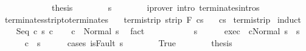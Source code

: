 \begin{isabellebody}
\ \ \ \ \isacommand{{\isacharbraceright}}\isamarkupfalse%
\isanewline
\ \ \ \ \isamarkupfalse%
\ \isamarkupfalse%
\ {\isacharquery}thesis\isanewline
\ \ \ \ \ \ \isamarkupfalse%
\ s\isanewline
\ \ \ \ \ \ \isamarkupfalse%
\ {\isacharparenleft}iprover\ intro{\isacharcolon}\ terminates{\isachardot}intros{\isacharparenright}\isanewline
\ \ \isamarkupfalse%
\isanewline
{}\isamarkupfalse%
%
\endisatagproof
{\isafoldproof}%
%
\isadelimproof
\isanewline
%
\endisadelimproof
\isanewline
{}\isamarkupfalse%
\ terminates{\isacharunderscore}strip{\isacharunderscore}to{\isacharunderscore}terminates{\isacharcolon}\isanewline
\ \ \ termi{\isacharunderscore}strip{\isacharcolon}\ {\isachardoublequoteopen}strip\ F\ {\isasymGamma}{\isasymturnstile}c{\isasymdown}s{\isachardoublequoteclose}\isanewline
\ \ \ {\isachardoublequoteopen}{\isasymGamma}{\isasymturnstile}c{\isasymdown}s{\isachardoublequoteclose}\isanewline
%
\isadelimproof
%
\endisadelimproof
%
\isatagproof
{}\isamarkupfalse%
\ termi{\isacharunderscore}strip\isanewline
{}\isamarkupfalse%
\ induct\isanewline
\ \ \isamarkupfalse%
\ {\isacharparenleft}Seq\ c{}\ s\ c{}{\isacharparenright}\isanewline
\ \ \isamarkupfalse%
\ {\isachardoublequoteopen}{\isasymGamma}{\isasymturnstile}c{}\ {\isasymdown}\ Normal\ s{\isachardoublequoteclose}\ \isamarkupfalse%
\ fact\isanewline
\ \ \isamarkupfalse%
\isanewline
\ \ \isacommand{{\isacharbraceleft}}\isamarkupfalse%
\isanewline
\ \ \ \ \isamarkupfalse%
\ s{\isacharprime}\isanewline
\ \ \ \ \isamarkupfalse%
\ exec{\isacharcolon}\ {\isachardoublequoteopen}{\isasymGamma}{\isasymturnstile}\ {\isasymlangle}c{}{\isacharcomma}Normal\ s{\isasymrangle}\ {\isasymRightarrow}\ s{\isacharprime}{\isachardoublequoteclose}\isanewline
\ \ \ \ \isamarkupfalse%
\ {\isachardoublequoteopen}{\isasymGamma}{\isasymturnstile}c{}\ {\isasymdown}\ s{\isacharprime}{\isachardoublequoteclose}\isanewline
\ \ \ \ \isamarkupfalse%
\ {\isacharparenleft}cases\ {\isachardoublequoteopen}isFault\ s{\isacharprime}{\isachardoublequoteclose}{\isacharparenright}\isanewline
\ \ \ \ \ \ \isamarkupfalse%
\ True\isanewline
\ \ \ \ \ \ \isamarkupfalse%
\ {\isacharquery}thesis\isanewline
\ \ \ \ \ \ \ \ \isamarkupfalse%

\end{isabellebody}
